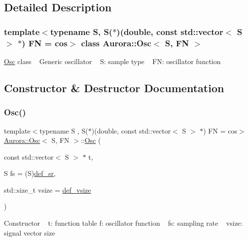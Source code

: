 \subsection{Detailed Description}
\subsubsection*{template$<$typename S, S($\ast$)(double, const std\+::vector$<$ S $>$ $\ast$) FN = cos$>$\newline
class Aurora\+::\+Osc$<$ S, F\+N $>$}

\hyperlink{class_aurora_1_1_osc}{Osc} class ~\newline
Generic oscillator ~\newline
S\+: sample type ~\newline
FN\+: oscillator function 

\subsection{Constructor \& Destructor Documentation}
\mbox{\label{class_aurora_1_1_osc_aa0ff8c343d8e8c0503ed00445d504348}} 
\subsubsection{\texorpdfstring{Osc()}{Osc()}\hspace{0.1cm}{\footnotesize\ttfamily [1/2]}}
{\footnotesize\ttfamily template$<$typename S , S($\ast$)(double, const std\+::vector$<$ S $>$ $\ast$) FN = cos$>$ \\
\hyperlink{class_aurora_1_1_osc}{Aurora\+::\+Osc}$<$ S, FN $>$\+::\hyperlink{class_aurora_1_1_osc}{Osc} (\begin{DoxyParamCaption}\item[{const std\+::vector$<$ S $>$ $\ast$}]{t,  }\item[{S}]{fs = {\ttfamily (S)\hyperlink{namespace_aurora_ad49263d809bea98dd422e95bc91bc03e}{def\+\_\+sr}},  }\item[{std\+::size\+\_\+t}]{vsize = {\ttfamily \hyperlink{namespace_aurora_afaaddf667a06e7ce23c667a8b7295263}{def\+\_\+vsize}} }\end{DoxyParamCaption})\hspace{0.3cm}{\ttfamily [inline]}}

Constructor ~\newline
t\+: function table f\+: oscillator function ~\newline
fs\+: sampling rate ~\newline
vsize\+: signal vector size \mbox{\label{class_aurora_1_1_osc_a696356c8638245c8c924adc2bfdc1d0e}} 
